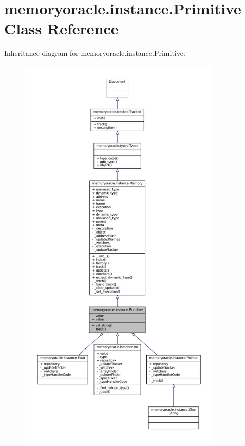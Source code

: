 \hypertarget{classmemoryoracle_1_1instance_1_1Primitive}{}\section{memoryoracle.\+instance.\+Primitive Class Reference}
\label{classmemoryoracle_1_1instance_1_1Primitive}


Inheritance diagram for memoryoracle.\+instance.\+Primitive\+:
\nopagebreak
\begin{figure}[H]
\begin{center}
\leavevmode
\includegraphics[height=550pt]{classmemoryoracle_1_1instance_1_1Primitive__inherit__graph}
\end{center}
\end{figure}


